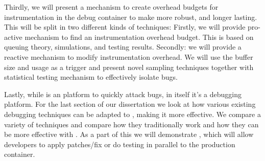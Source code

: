 Thirdly, we will present a mechanism to create overhead budgets for instrumentation in the debug container to make \livedebugging more robust, and longer lasting.
This will be split in two different kinds of techniques: Firstly, we will provide pro-active mechanism to find an instrumentation overhead budget. This is based on queuing theory, simulations, and testing results. 
Secondly: we will provide a reactive mechanism to modify instrumentation overhead. 
We will use the buffer size and usage as a trigger and present novel sampling techniques together with statistical testing mechanism to effectively isolate bugs.

Lastly, while \parikshan is an platform to quickly attack bugs, in itself it's a debugging platform. For the last section of our dissertation we look at how various existing debugging techniques can be adapted to \livedebugging, making it more effective. We compare a variety of techniques and compare how they traditionally work and how they can be more effective with \parikshan. As a part of this we will demonstrate \activedebugging, which will allow developers to apply patches/fix or do testing in parallel to the production container.

